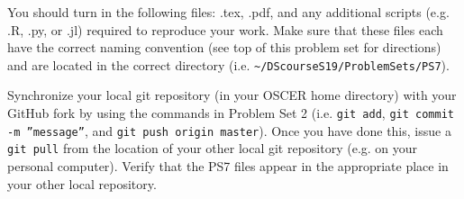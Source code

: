 \documentclass[12pt,english]{exam}
\begin{document}
\begin{questions}
\question You should turn in the following files: .tex, .pdf, and any additional scripts (e.g. .R, .py, or .jl) required to reproduce your work.  Make sure that these files each have the correct naming convention (see top of this problem set for directions) and are located in the correct directory (i.e. \texttt{\textasciitilde/DScourseS19/ProblemSets/PS7}).

\question Synchronize your local git repository (in your OSCER home directory) with your GitHub fork by using the commands in Problem Set 2 (i.e. \texttt{git add}, \texttt{git commit -m ''message''}, and \texttt{git push origin master}). Once you have done this, issue a \texttt{git pull} from the location of your other local git repository (e.g. on your personal computer). Verify that the PS7 files appear in the appropriate place in your other local repository.

\end{questions}
\end{document}
